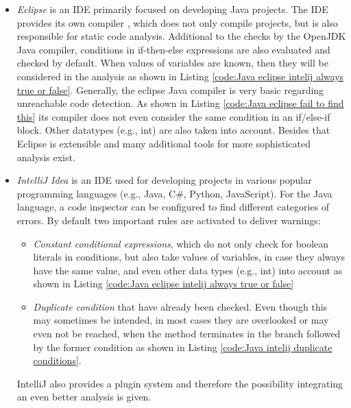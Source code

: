 \begin{itemize}
	\item \emph{Eclipse} \cite{incCommunityOpenInnovation} is an IDE primarily focused on developing Java projects. The IDE provides its own compiler \cite{teamJDTCoreComponent}, which does not only compile projects, but is also responsible for static code analysis. Additional to the checks by the OpenJDK \cite{OpenJDK} Java compiler, conditions in if-then-else expressions are also evaluated and checked by default. When values of variables are known, then they will be considered in the analysis as shown in Listing \ref{code:Java eclipse intelij always true or false}. Generally, the eclipse Java compiler is very basic regarding unreachable code detection. As shown in Listing \ref{code:Java eclipse fail to find this} its compiler does not even consider the same condition in an if/else-if block. Other datatypes (e.g., int) are also taken into account. Besides that Eclipse is extensible and many additional tools for more sophisticated analysis exist.
	
	\item \emph{IntelliJ Idea} \cite{IntelliJIDEACapable} is an IDE used for developing projects in various popular programming languages (e.g., Java, C\#, Python, JavaScript). For the Java language, a code inspector can be configured to find different categories of errors. By default two important rules are activated to deliver warnings: 
	\begin{itemize}
		\item \emph{Constant conditional expressions}, which do not only check for boolean literals in conditions, but also take values of variables, in case they always have the same value, and even other data types (e.g., int) into account as shown in Listing \ref{code:Java eclipse intelij always true or false}
		\item \emph{Duplicate condition} that have already been checked. Even though this may sometimes be intended, in most cases they are overlooked or may even not be reached, when the method terminates in the branch followed by the former condition as shown in Listing \ref{code:Java intelij duplicate conditions}. 
	\end{itemize}
	IntelliJ also provides a plugin system and therefore the possibility integrating an even better analysis is given.
\end{itemize}

